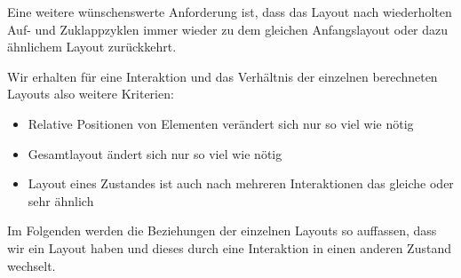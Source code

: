 Eine weitere wünschenswerte Anforderung ist, dass das Layout nach wiederholten Auf- und Zuklappzyklen immer wieder zu dem gleichen Anfangslayout oder dazu ähnlichem Layout zurückkehrt.

Wir erhalten für eine Interaktion und das Verhältnis der einzelnen berechneten Layouts also weitere Kriterien:
\begin{itemize}
\item Relative Positionen von Elementen verändert sich nur so viel wie nötig
\item Gesamtlayout ändert sich nur so viel wie nötig
\item Layout eines Zustandes ist auch nach mehreren Interaktionen das gleiche oder sehr ähnlich
\end{itemize}


Im Folgenden werden die Beziehungen der einzelnen Layouts so auffassen, dass wir ein Layout haben und dieses durch eine Interaktion in einen anderen Zustand wechselt.








